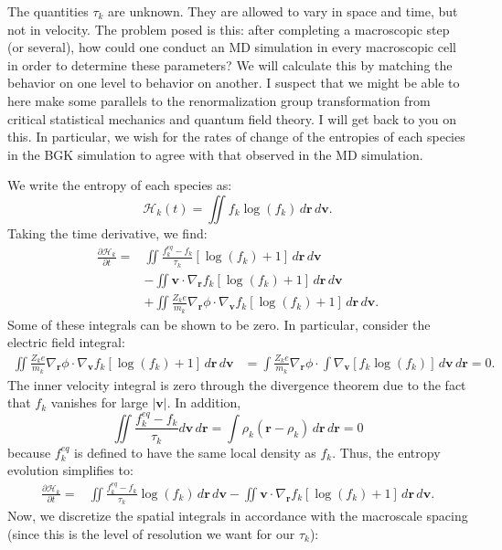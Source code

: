 \documentclass{article}
\begin{document}
The quantities $\tau_{k}$ are unknown. They are allowed to vary in space and time, but not in velocity. The problem posed is this: after completing a macroscopic step (or several), how could one conduct an MD simulation in every macroscopic cell in order to determine these parameters? We will calculate this by matching the behavior on one level to behavior on another.  I suspect that we might be able to here make some parallels to the renormalization group transformation from critical statistical mechanics and quantum field theory. I will get back to you on this. In particular, we wish for the rates of change of the entropies of each species in the BGK simulation to agree with that observed in the MD simulation.

We write the entropy of each species as:
\begin{equation}
\mathcal{H}_k(t)=\iint f_k\log(f_k)\,d\mathbf{r}\,d\mathbf{v}.
\end{equation}Taking the time derivative, we find:
\begin{align*}
\frac{\partial \mathcal{H}_k}{\partial t}=&\iint \frac{f_{k}^{eq}-f_k}{\tau_{k}}[\log(f_k)+1]\,d\mathbf{r}\,d\mathbf{v}\\
&-\iint \mathbf{v}\cdot \nabla_{\mathbf{r}}f_k[\log(f_k)+1]\,d\mathbf{r}\,d\mathbf{v}\\
&+\iint \frac{Z_ke}{m_k}\nabla_\mathbf{r}\phi\cdot \nabla_\mathbf{v}f_k[\log(f_k)+1]\,d\mathbf{r}\,d\mathbf{v}.
\end{align*}Some of these integrals can be shown to be zero. In particular, consider the electric field integral:
\begin{align*}\iint \frac{Z_k e}{m_k}\nabla_\mathbf{r}\phi\cdot\nabla_\mathbf{v}f_k[\log(f_k)+1]\,d\mathbf{r}\,d\mathbf{v}&=\int \frac{Z_k e}{m_k}\nabla_\mathbf{r}\phi\cdot\int \nabla_\mathbf{v}[f_k\log(f_k)]\,d\mathbf{v}\,d\mathbf{r}=0.
\end{align*}The inner velocity integral is zero through the divergence theorem due to the fact that $f_k$ vanishes for large $|\mathbf{v}|$. In addition,
\[\iint \frac{f_k^{eq}-f_k}{\tau_k}d\mathbf{v}\,d\mathbf{r}=\int \rho_k(\mathbf{r}-\rho_k)\,d\mathbf{r}\,d\mathbf{r}=0
\]because $f_k^{eq}$ is defined to have the same local density as $f_k$. Thus, the entropy evolution simplifies to:
\begin{align*}
\frac{\partial \mathcal{H}_k}{\partial t}=&\iint \frac{f_{k}^{eq}-f_k}{\tau_{k}}\log(f_k)\,d\mathbf{r}\,d\mathbf{v}-\iint \mathbf{v}\cdot \nabla_{\mathbf{r}}f_k[\log(f_k)+1]\,d\mathbf{r}\,d\mathbf{v}.
\end{align*}Now, we discretize the spatial integrals in accordance with the macroscale spacing (since this is the level of resolution we want for our $\tau_k$):
\end{document}
